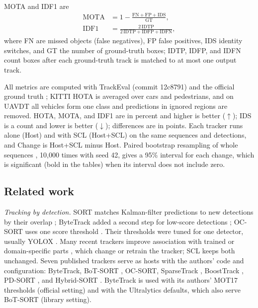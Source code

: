 \documentclass[pdflatex,sn-mathphys-num,iicol]{sn-jnl}
\newcommand{\scl}{SCL}
\begin{document}
MOTA \cite{bernardin2008clear} and IDF1 \cite{ristani2016idf1} are
\begin{align}
\mathrm{MOTA}&=1-\frac{\mathrm{FN}+\mathrm{FP}+\mathrm{IDS}}{\mathrm{GT}},\label{eq:mota}\\
\mathrm{IDF1}&=\frac{2\,\mathrm{IDTP}}{2\,\mathrm{IDTP}+\mathrm{IDFP}+\mathrm{IDFN}},\label{eq:idf1}
\end{align}
where FN are missed objects (false negatives), FP false positives, IDS identity switches, and GT the
number of ground-truth boxes; IDTP, IDFP, and IDFN count boxes after each ground-truth track is
matched to at most one output track.

All metrics are computed with TrackEval (commit 12c8791) and the official ground truth
\cite{dendorfer2021motchallenge}; KITTI HOTA is averaged over cars and pedestrians, and on UAVDT all
vehicles form one class and predictions in ignored regions are removed. HOTA, MOTA, and IDF1 are in
percent and higher is better ($\uparrow$); IDS is a count and lower is better ($\downarrow$);
differences are in points. Each tracker runs alone (Host) and with \scl{} (Host+\scl{}) on the same
sequences and detections, and Change is Host+\scl{} minus Host. Paired bootstrap resampling of whole
sequences \cite{efron2016casi}, 10,000 times with seed 42, gives a 95\% interval for each
change, which is significant (bold in the tables) when its interval does not include zero.

\subsection{Related work}\label{sec:survey}
\emph{Tracking by detection.}\label{sec:hosts} SORT matches Kalman-filter predictions to new
detections by their overlap \cite{bewley2016sort}; ByteTrack added a second step for low-score
detections \cite{zhang2022bytetrack}; OC-SORT uses one score threshold \cite{cao2023ocsort}. Their
thresholds were tuned for one detector, usually YOLOX \cite{ge2021yolox}. Many recent trackers improve
association with trained or domain-specific parts
\cite{li2024fdbtrack,bao2024graphmatching,zhang2025sinkhorn,ding2025remot,liang2024motiontrack,sun2026bsr},
which change or retrain the tracker; \scl{} keeps both unchanged. Seven published trackers serve as
hosts with the authors' code and configuration: ByteTrack, BoT-SORT \cite{aharon2022botsort},
OC-SORT, SparseTrack \cite{liu2025sparsetrack}, BoostTrack \cite{stanojevic2024boosttrack}, PD-SORT
\cite{wang2025pdsort}, and Hybrid-SORT \cite{yang2024hybridsort}. ByteTrack is used with its authors'
MOT17 thresholds (official setting) and with the Ultralytics defaults, which also serve BoT-SORT
(library setting).
\end{document}
